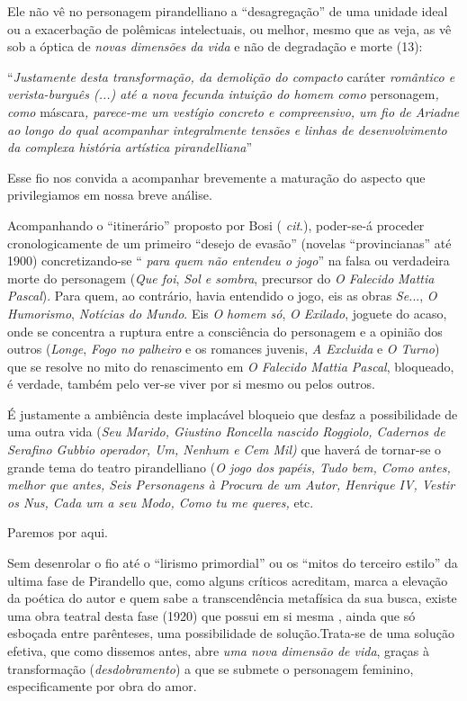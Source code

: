 Ele não vê no personagem pirandelliano a ``desagregação'' de uma unidade
ideal ou a exacerbação de polêmicas intelectuais, ou melhor, mesmo que
as veja, as vê sob a óptica de \emph{novas dimensões da vida} e não de
degradação e morte (13):

``\emph{Justamente desta transformação, da demolição do compacto}
caráter \emph{romântico e verista-burguês (...) até a nova fecunda
intuição do homem como} personagem\emph{, como} máscara\emph{, parece-me
um vestígio concreto e compreensivo, um fio de Ariadne ao longo do qual
acompanhar integralmente tensões e linhas de desenvolvimento da complexa
história artística pirandelliana}''

Esse fio nos convida a acompanhar brevemente a maturação do aspecto que
privilegiamos em nossa breve análise.

Acompanhando o ``itinerário'' proposto por Bosi ( \emph{cit}.),
poder-se-á proceder cronologicamente de um primeiro ``desejo de evasão''
(novelas ``provincianas'' até 1900) concretizando-se `` \emph{para quem
não entendeu o jogo}'' na falsa ou verdadeira morte do personagem
(\emph{Que foi}, \emph{Sol e sombra}, precursor do \emph{O Falecido}
\emph{Mattia Pascal}). Para quem, ao contrário, havia entendido o jogo,
eis as obras \emph{Se.}.., \emph{O Humorismo}, \emph{Notícias do Mundo}.
Eis \emph{O} \emph{homem só}, \emph{O Exilado}, joguete do acaso, onde
se concentra a ruptura entre a consciência do personagem e a opinião dos
outros (\emph{Longe}, \emph{Fogo no palheiro} e os romances juvenis,
\emph{A Excluida} e \emph{O Turno}) que se resolve no mito do
renascimento em \emph{O Falecido Mattia Pascal}, bloqueado, é verdade,
também pelo ver-se viver por si mesmo ou pelos outros.

É justamente a ambiência deste implacável bloqueio que desfaz a
possibilidade de uma outra vida (\emph{Seu Marido, Giustino Roncella
nascido Roggiolo, Cadernos de Serafino Gubbio operador, Um, Nenhum e Cem
Mil)} que haverá de tornar-se o grande tema do teatro pirandelliano
(\emph{O jogo dos papéis, Tudo bem, Como antes, melhor que antes, Seis
Personagens à Procura de um Autor, Henrique IV, Vestir os Nus, Cada um a
seu Modo, Como tu me queres,} etc.

Paremos por aqui.

Sem desenrolar o fio até o ``lirismo primordial'' ou os ``mitos do
terceiro estilo'' da ultima fase de Pirandello que, como alguns críticos
acreditam, marca a elevação da poética do autor e quem sabe a
transcendência metafísica da sua busca, existe uma obra teatral desta
fase (1920) que possui em si mesma , ainda que só esboçada entre
parênteses, uma possibilidade de solução.Trata-se de uma solução
efetiva, que como dissemos antes, abre \emph{uma nova dimensão de vida},
graças à transformação (\emph{desdobramento}) a que se submete o
personagem feminino, especificamente por obra do amor.

